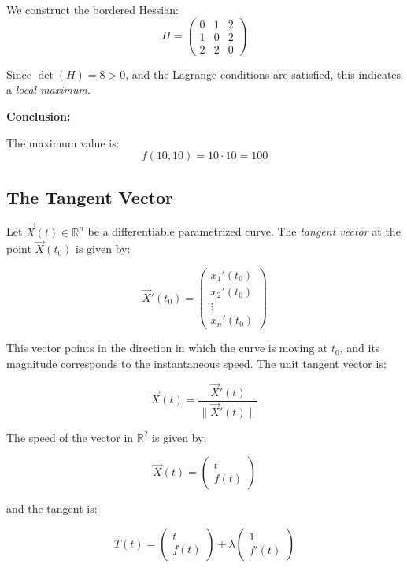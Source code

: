 We construct the bordered Hessian:
\[
H = \begin{pmatrix}
0 & 1 & 2 \\
1 & 0 & 2 \\
2 & 2 & 0
\end{pmatrix}
\]

Since \( \det(H) = 8 > 0 \), and the Lagrange conditions are satisfied, this indicates a \emph{local maximum}.
\vspace{\baselineskip}

\textbf{Conclusion:}
\vspace{\baselineskip}

The maximum value is:
\[
f(10, 10) = 10 \cdot 10 = \boxed{100}
\]


\subsection{The Tangent Vector}

Let \( \vec{X}(t) \in \mathbb{R}^n \) be a differentiable parametrized curve. The \emph{tangent vector} at the point 
\( \vec{X}(t_0) \) is given by:

\[
\vec{X}'(t_0) = \begin{pmatrix}
    x_1 ' (t_0) \\ x_2 ' (t_0) \\ \vdots \\ x_n ' (t_0)
\end{pmatrix}
\]

This vector points in the direction in which the curve is moving at \( t_0 \), and its magnitude corresponds to the
 instantaneous speed. The unit tangent vector is:

\[
\vec{X}(t) = \frac{\vec{X}'(t)}{\|\vec{X}'(t)\|}
\]

The speed of the vector in \(\mathbb{R}^2\) is given by:

\[
\vec{X}(t) = \begin{pmatrix}
    t \\ f(t)
\end{pmatrix}
\]

and the tangent is:

\[
T(t) = \begin{pmatrix}
    t \\ f(t)
\end{pmatrix} + \lambda \begin{pmatrix}
    1 \\ f'(t)
\end{pmatrix}
\]

